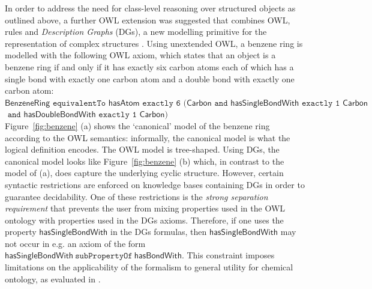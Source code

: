 \documentclass[10pt]{bmc_article}
\newenvironment{bmcformat}{\baselineskip20pt\sloppy\setboolean{publ}{false}}{\baselineskip20pt\sloppy}
\begin{document}
\begin{bmcformat}
In order to address the need for class-level reasoning over structured objects as outlined above, a further OWL extension was suggested that combines OWL, rules and \emph{Description Graphs} (DGs), a new modelling primitive for the representation of complex structures  \cite{mghs09graphs-journal}. Using unextended OWL, a benzene ring is modelled with the following OWL axiom, which states that an object is a benzene ring if and only if it has exactly six carbon atoms each of which has a single bond with exactly one carbon atom and a double bond with exactly one carbon atom:\\
$ \mathsf{BenzeneRing} \texttt{ equivalentTo } \mathsf{hasAtom} \texttt{ exactly 6 } (\mathsf{Carbon} \texttt{ and } \mathsf{hasSingleBondWith} \texttt{ exactly 1 } \mathsf{Carbon}$ \\
$ \texttt{ and } \mathsf{hasDoubleBondWith} \texttt{ exactly 1 } \mathsf{Carbon)}$\\
Figure~\ref{fig:benzene} (a) shows the `canonical' model of the benzene ring according to the OWL semantics: informally, the canonical model is what the logical definition encodes. The OWL model is tree-shaped. 
Using DGs, the canonical model looks like Figure~\ref{fig:benzene} (b) which, in contrast to the model of (a), does capture the underlying cyclic structure. 
However, certain syntactic restrictions are enforced on knowledge bases containing DGs in order to guarantee decidability. One of these restrictions is the \emph{strong separation requirement} that prevents the user from mixing properties used in the OWL ontology with properties used in the DGs axioms. Therefore, if one uses the property $\mathsf{hasSingleBondWith}$ in the DGs formulas, then $\mathsf{hasSingleBondWith}$ may not occur in e.g. an axiom of the form $\mathsf{hasSingleBondWith} ~\texttt{subPropertyOf}~ \mathsf{hasBondWith}$. This constraint imposes limitations on the applicability of the formalism to general utility for chemical ontology, as evaluated in \cite{hastingsowled2010}.


\end{bmcformat}
\end{document}
